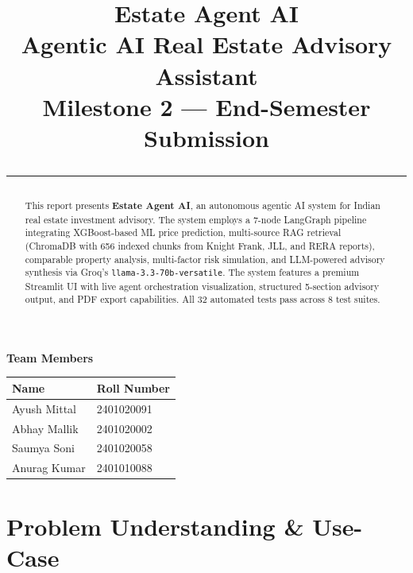 \documentclass[12pt,a4paper]{article}
\title{
\vspace{-1cm}
{\Huge\bfseries Estate Agent AI}\\[0.3cm]
{\Large Agentic AI Real Estate Advisory Assistant}\\[0.5cm]
{\large Milestone 2 — End-Semester Submission}\\[0.3cm]
\rule{\textwidth}{1pt}
}
\begin{document}
\maketitle

\vspace{1cm}

\begin{center}
{\large\textbf{Team Members}}\\[0.5cm]

\begin{tabular}{ll}
\toprule
\textbf{Name} & \textbf{Roll Number} \\
\midrule
Ayush Mittal & 2401020091 \\
Abhay Mallik & 2401020002 \\
Saumya Soni & 2401020058 \\
Anurag Kumar & 2401010088 \\
\bottomrule
\end{tabular}
\end{center}

\vspace{1cm}
\thispagestyle{empty}

\begin{abstract}
This report presents \textbf{Estate Agent AI}, an autonomous agentic AI system for Indian real estate investment advisory. The system employs a 7-node LangGraph pipeline integrating XGBoost-based ML price prediction, multi-source RAG retrieval (ChromaDB with 656 indexed chunks from Knight Frank, JLL, and RERA reports), comparable property analysis, multi-factor risk simulation, and LLM-powered advisory synthesis via Groq's \texttt{llama-3.3-70b-versatile}. The system features a premium Streamlit UI with live agent orchestration visualization, structured 5-section advisory output, and PDF export capabilities. All 32 automated tests pass across 8 test suites.
\end{abstract}

\tableofcontents
\newpage

\section{Problem Understanding \& Use-Case}
\end{document}
